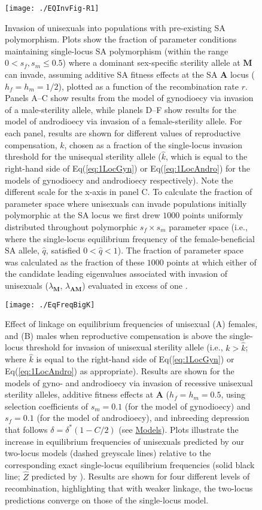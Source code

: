 \documentclass{article}
\newcommand\hl[1]{%
  \bgroup
  \hskip0pt\color{blue!80!black}%
  #1%
  \egroup
}
\begin{document}
\begin{figure}[htbp]
\centering
\texttt{[image: ./EQInvFig-R1]}
\caption{Invasion of unisexuals into populations with pre-existing SA polymorphism. Plots show the fraction of parameter conditions maintaining single-locus SA polymorphism (within the range $0 < s_f,s_m \leq 0.5$) where a dominant sex-specific sterility allele at $\mathbf{M}$ can invade, assuming additive SA fitness effects at the SA $\mathbf{A}$ locus ($h_f=h_m=1/2$), plotted as a function of the recombination rate $r$. Panels A--C show results from the model of gynodioecy via invasion of a male-sterility allele, while planels D--F show results for the model of androdioecy via invasion of a female-sterility allele. For each panel, results are shown for different values of reproductive compensation, $k$, chosen as a fraction of the single-locus invasion threshold for the unisequal sterility allele ($\hat{k}$, which is equal to the right-hand side of Eq(\ref{eq:1LocGyn}) or Eq(\ref{eq:1LocAndro}) for the models of gynodioecy and androdioecy respectively). Note the different scale for the x-axis in panel C. \hl{To calculate the fraction of parameter space where unisexuals can invade populations initially polymorphic at the SA locus we first drew $1000$ points uniformly distributed throughout polymorphic $s_f \times s_m$ parameter space (i.e., where the single-locus equilibrium frequency of the female-beneficial SA allele, $\hat{q}$, satisfied $0 < \hat{q} < 1$). The fraction of parameter space was calculated as the fraction of these $1000$ points at which either of the candidate leading eigenvalues associated with invasion of unisexuals ($\lambda_{\mathbf{M}}$, $\lambda_{\mathbf{AM}}$) evaluated in excess of one}.}
\label{fig:PrInv}
\end{figure}
\newpage{}

\begin{figure}[htbp]
\centering
\texttt{[image: ./EqFreqBigK]}
\caption{Effect of linkage on equilibrium frequencies of unisexual (A) females, and (B) males when reproductive compensation is above the single-locus threshold for invasion of unisexual sterility allele (i.e., $k > \hat{k}$; where $\hat{k}$ is equal to the right-hand side of Eq(\ref{eq:1LocGyn}) or Eq(\ref{eq:1LocAndro}) as appropriate). Results are shown for the models of gyno- and androdioecy via invasion of recessive unisexual sterility alleles, additive fitness effects at $\mathbf{A}$ ($h_f = h_m = 0.5$, using selection coefficients of $s_m = 0.1$ (for the model of gynodioecy) and $s_f = 0.1$ (for the model of androdioecy), and inbreeding depression that follows $\delta = \delta^\ast(1 - C/2)$ (see \hyperref[sec:Models]{Models}). Plots illustrate the increase in equilibrium frequencies of unisexuals predicted by our two-locus models (dashed greyscale lines) relative to the corresponding exact single-locus equilibrium frequencies (solid black line; $\hat{Z}$ predicted by \citealt{Charlesworth1978a}). Results are shown for four different levels of recombination, highlighting that with weaker linkage, the two-locus predictions converge on those of the single-locus model.}
\label{fig:eqFreq2v1Loc}
\end{figure}
\newpage{}
\end{document}

